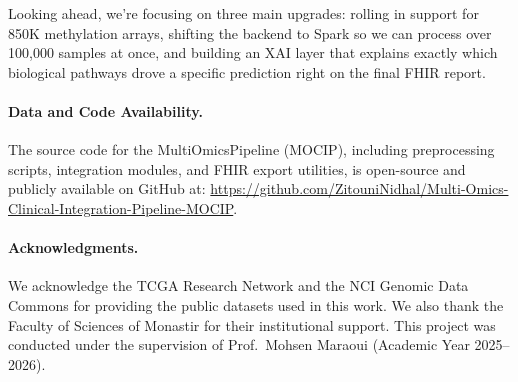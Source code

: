 \documentclass[runningheads]{llncs}
\begin{document}
Looking ahead, we're focusing on three main upgrades: rolling in support for 850K methylation arrays, shifting the backend to Spark so we can process over 100,000 samples at once, and building an XAI layer that explains exactly which biological pathways drove a specific prediction right on the final FHIR report.

\paragraph{Data and Code Availability.}
{\sloppy
The source code for the MultiOmicsPipeline (MOCIP), including preprocessing scripts, integration modules, and FHIR export utilities, is open-source and publicly available on GitHub at: \url{https://github.com/ZitouniNidhal/Multi-Omics-Clinical-Integration-Pipeline-MOCIP}.
}

\paragraph{Acknowledgments.}
\noindent We acknowledge the TCGA Research Network and the NCI Genomic Data Commons for providing the public datasets used in this work. We also thank the Faculty of Sciences of Monastir for their institutional support. This project was conducted under the supervision of Prof.\ Mohsen Maraoui (Academic Year 2025--2026).

\label{page:before_refs}


\end{document}
